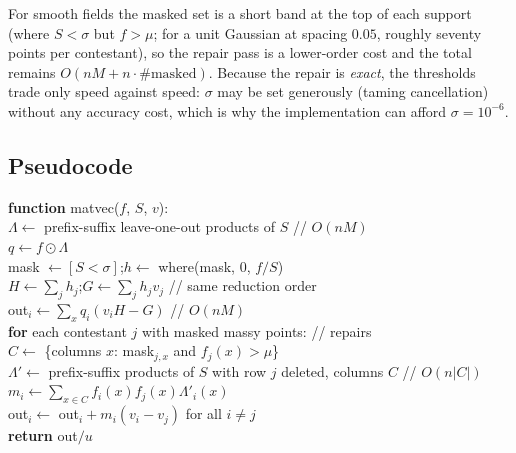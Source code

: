 \documentclass[11pt]{article}
\theoremstyle{definition}
\theoremstyle{remark}
\begin{document}
For smooth fields the masked set is a short band at the top of each
support (where $S < \sigma$ but $f > \mu$; for a unit Gaussian at spacing
$0.05$, roughly seventy points per contestant), so the repair pass is a
lower-order cost and the total remains $O(nM + n\cdot\#\text{masked})$.
Because the repair is \emph{exact}, the thresholds trade only speed against
speed: $\sigma$ may be set generously (taming cancellation) without any
accuracy cost, which is why the implementation can afford
$\sigma = 10^{-6}$.

\subsection{Pseudocode}

\begin{center}
\begin{minipage}{0.92\linewidth}
\small\ttfamily
\textbf{function} matvec($f$, $S$, $v$):\\
\hspace*{1.5em} $\Lambda \gets$ prefix-suffix leave-one-out products of $S$ \hfill // $O(nM)$\\
\hspace*{1.5em} $q \gets f \odot \Lambda$\\
\hspace*{1.5em} mask $\gets [S < \sigma]$;\quad $h \gets$ where(mask, $0$, $f / S$)\\
\hspace*{1.5em} $H \gets \sum_j h_j$;\quad $G \gets \sum_j h_j v_j$ \hfill // same reduction order\\
\hspace*{1.5em} out$_i \gets \sum_x q_i (v_i H - G)$ \hfill // $O(nM)$\\
\hspace*{1.5em} \textbf{for} each contestant $j$ with masked massy points: \hfill // repairs\\
\hspace*{2.8em} $C \gets$ \{columns $x$: mask$_{j,x}$ and $f_j(x) > \mu$\}\\
\hspace*{2.8em} $\Lambda' \gets$ prefix-suffix products of $S$ with row $j$ deleted, columns $C$ \hfill // $O(n|C|)$\\
\hspace*{2.8em} $m_i \gets \sum_{x \in C} f_i(x) f_j(x) \Lambda'_i(x)$\\
\hspace*{2.8em} out$_i \gets$ out$_i + m_i (v_i - v_j)$ \quad for all $i \ne j$\\
\hspace*{1.5em} \textbf{return} out$/u$
\end{minipage}
\end{center}
\end{document}
